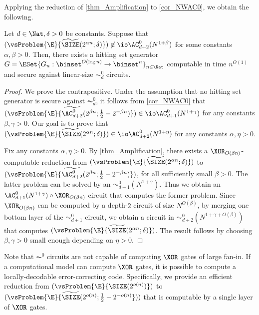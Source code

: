 \documentclass{toc}
\begin{document}
Applying the reduction of \cref{thm_Amplification} to \cref{cor_NWAC0},
we obtain the following.
\begin{corollary}
  Let $d \in \Nat, \delta > 0$ be constants.
  Suppose that
  $(\vsProblem{\E}{\widetilde{\SIZE} (2^{\alpha n} ; \delta)} ) \not\in \io \AC^0_{d+2} (N^{1 + \beta})$
  for some constants $\alpha, \beta > 0$.
  Then,
  there exists a hitting set generator $G = \ESet{ G_n : \binset^{O(\log n)} \to \binset^n }_{n \in \Nat} $ computable in time $n^{O(1)}$ and secure against linear-size $\AC^0_{d}$ circuits.
\end{corollary}
\begin{proof}
  We prove the contrapositive.
  Under the assumption that no hitting set generator is secure against $\AC^0_d$,
  it follows from \cref{cor_NWAC0}
  that
  $(\vsProblem{\E}{\widetilde{\AC^{0}_{d+2}} (2^{\beta n} ; \frac{1}{2} - 2^{- \beta n})}) \in \io \AC^0_{d+1} (N^{1 + \gamma})$
  for any constants $\beta, \gamma > 0$.
  Our goal is to prove that
  $(\vsProblem{\E}{\widetilde{\SIZE} (2^{\alpha n} ; \delta)}) \in \io \AC^0_{d+2} (N^{1 + \eta})$
  for any constants $\alpha, \eta > 0$.

  Fix any constants $\alpha, \eta > 0$.
  By \cref{thm_Amplification},
  there exists a $\XOR_{O(\beta n)}$-computable reduction from
  $(\vsProblem{\E}{\widetilde{\SIZE} (2^{\alpha n} ; \delta)})$
  to
  $(\vsProblem{\E}{\widetilde{\AC^{0}_{d+2}} (2^{\beta n} ; \frac{1}{2} - 2^{- \beta n})})$,
  for all sufficiently small $\beta > 0$.
  The latter problem can be solved by an $\AC^0_{d+1}(N^{1 + \gamma})$.
  Thus we obtain an $\AC^0_{d + 1}(N^{1 + \gamma}) \circ \XOR_{O(\beta n)}$ circuit that computes the former problem.
  Since $\XOR_{O(\beta n)}$ can be computed by a depth-$2$ circuit of size $N^{O(\beta)}$,
  by merging one bottom layer of the $\AC^0_{d+1}$ circuit,
  we obtain a circuit in $\AC^0_{d+2} (N^{1 + \gamma + O(\beta)})$ that computes
  $(\vsProblem{\E}{\widetilde{\SIZE} (2^{\alpha n} ; \delta)})$.
  The result follows by choosing $\beta, \gamma > 0$ small enough depending on $\eta > 0$.
\end{proof}

Note that $\AC^0$ circuits are not capable of computing $\XOR$ gates of large fan-in.
If a computational model can compute $\XOR$ gates,
it is possible to compute a locally-decodable error-correcting code.
Specifically, we provide an efficient reduction
from
$(\vsProblem{\E}{{\SIZE}(2^{o( n )})})$
to
$(\vsProblem{\E}{\widetilde{\SIZE}(2^{o( n )}; \frac{1}{2} - 2^{-o( n )}}))$
that is computable by a single layer of $\XOR$ gates.
\end{document}
